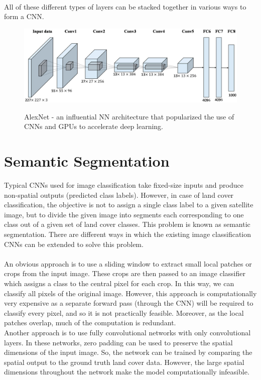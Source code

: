 \documentclass[12pt, a4paper]{report}
\begin{document}
\paragraph{}
All of these different types of layers can be stacked together in various ways to form a CNN.
\begin{figure}[h]
\centering
\includegraphics[width=\textwidth]{cnn3.jpg}
\caption{AlexNet - an influential NN architecture that popularized the use of CNNs and GPUs to accelerate deep learning.}\cite{alexnet, alexnetimg}
\end{figure}
\section{Semantic Segmentation}
Typical CNNs used for image classification take fixed-size inputs and produce non-spatial outputs (predicted class labels). However, in case of land cover classification, the objective is not to assign a single class label to a given satellite image, but to divide the given image into segments each corresponding to one class out of a given set of land cover classes. This problem is known as semantic segmentation. There are different ways in which the existing image classification CNNs can be extended to solve this problem.
\paragraph{}
An obvious approach is to use a sliding window to extract small local patches or crops from the input image. These crops are then passed to an image classifier which assigns a class to the central pixel for each crop. In this way, we can classify all pixels of the original image. However, this approach is computationally very expensive as a separate forward pass (through the CNN) will be required to classify every pixel, and so it is not practically feasible. Moreover, as the local patches overlap, much of the computation is redundant.\\
Another approach is to use fully convolutional networks with only convolutional layers. In these networks, zero padding can be used to preserve the spatial dimensions of the input image. So, the network can be trained by comparing the spatial output to the ground truth land cover data. However, the large spatial dimensions throughout the network make the model computationally infeasible. \cite{long2015fully, cs231n, unet}
\end{document}
